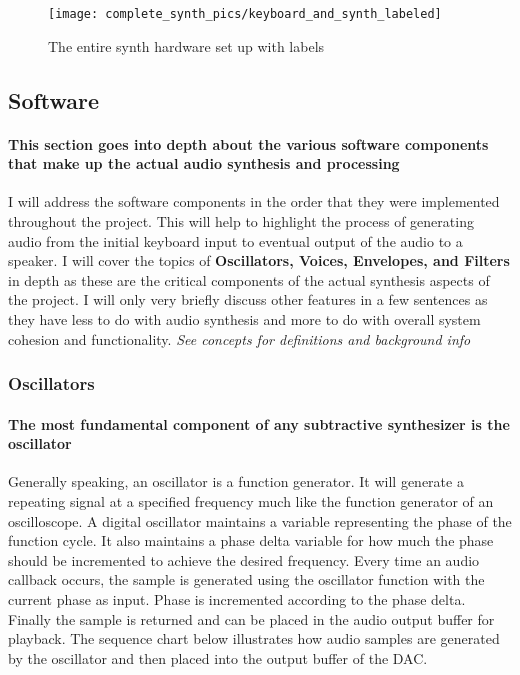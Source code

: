\documentclass[acmlarge,screen]{acmart}
\begin{document}
	\begin{figure}[H]
		\texttt{[image: complete\_synth\_pics/keyboard\_and\_synth\_labeled]}
		\caption{The entire synth hardware set up with labels}
		\centering
	\end{figure}

\subsection{Software}
	\paragraph{This section goes into depth about the various software components that make up the actual audio synthesis and processing} I will address the software components in the order that they were implemented throughout the project. This will help to highlight the process of generating audio from the initial keyboard input to eventual output of the audio to a speaker. I will cover the topics of \textbf{Oscillators, Voices, Envelopes, and Filters} in depth as these are the critical components of the actual synthesis aspects of the project. I will only very briefly discuss other features in a few sentences as they have less to do with audio synthesis and more to do with overall system cohesion and functionality. \textit{See concepts for definitions and background info}

	\subsubsection{Oscillators}
	\paragraph{The most fundamental component of any subtractive synthesizer is the oscillator} Generally speaking, an oscillator is a function generator. It will generate a repeating signal at a specified frequency much like the function generator of an oscilloscope. A digital oscillator maintains a variable representing the phase of the function cycle. It also maintains a phase delta variable for how much the phase should be incremented to achieve the desired frequency. Every time an audio callback occurs, the sample is generated using the oscillator function with the current phase as input. Phase is incremented according to the phase delta. Finally the sample is returned and can be placed in the audio output buffer for playback. The sequence chart below illustrates how audio samples are generated by the oscillator and then placed into the output buffer of the DAC.
	
\end{document}
